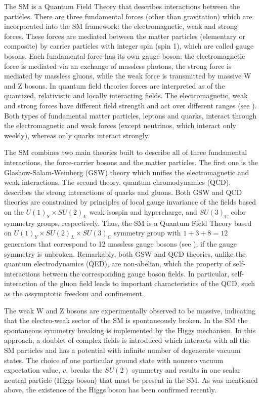 The SM is a Quantum Field Theory that describes interactions between the particles.
There are three fundamental forces (other than gravitation) which are incorporated into the SM framework: the electromagnetic, weak and strong forces. These forces are mediated between the matter particles (elementary or composite) by carrier particles with integer spin (spin 1), which are called gauge bosons.
Each fundamental force has its own gauge boson: the electromagnetic force is mediated via an exchange of massless photons, the strong force is mediated by massless gluons, while the weak force is transmitted by massive W and Z bosons.
In quantum field theories forces are interpreted as \toAsk[dynamics?] of the quantized, relativistic and locally interacting fields.
The electromagnetic, weak and strong forces have different field strength and act over different ranges (see ). 
Both types of fundamental matter particles, leptons and quarks, interact through the electromagnetic and weak forces (except neutrinos, which interact only weekly), whereas only quarks interact strongly.

The SM combines two main theories built to describe all of three fundamental interactions, the force-carrier bosons and the matter particles. The first one is the Glashow-Salam-Weinberg (GSW) theory which unifies the electromagnetic and weak interactions. The second theory, quantum chromodynamics (QCD), describes the strong interactions of quarks and gluons. Both GSW and QCD theories are constrained by principles of local gauge invariance of the fields based on the $U(1)_Y\times SU(2)_{L}$ weak isospin and hypercharge, and $SU(3)_C$ color symmetry groups, respectively. Thus, the SM is a Quantum Field Theory based on $U(1)_Y\times SU(2)_{L}\times SU(3)_C$ symmetry group with $1+3+8=12$ generators that correspond to 12 massless gauge bosons (see ), if the gauge symmetry is unbroken. 
Remarkably, both GSW and QCD theories, unlike the quantum electrodynamics (QED), are non-abelian, which \toAsk[determines?] the property of self-interactions between the corresponding gauge boson fields. In particular, self-interaction of the gluon field leads to important characteristics of the QCD, such as the assymptotic freedom and confinement.

The weak W and Z bosons are experimentally observed to be massive, indicating that the electro-weak sector of the SM is spontaneously broken. 
In the SM the spontaneous symmetry breaking is implemented by the Higgs mechanism. In this approach,
a doublet of complex fields is introduced which interacts with all the SM particles and has a potential with infinite number of degenerate vacuum states. 
The choice of one particular ground state with nonzero vacuum expectation value, $v$, breaks the $SU(2)$ symmetry and results in one scalar neutral particle (Higgs boson) that must be present in the SM. As was mentioned above, the existence of the Higgs boson has been confirmed recently.

